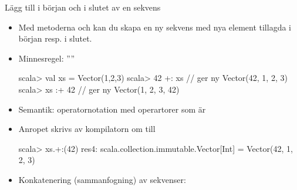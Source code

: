 \begin{Slide}{Lägg till i början och i slutet av en sekvens}
\begin{itemize}
\item Med metoderna \code{+:} och \code{:+} kan du skapa en ny sekvens med nya element tillagda i början resp. i slutet. 
\item Minnesregel: ''''
\begin{REPLnonum}
scala> val xs = Vector(1,2,3)
scala> 42 +: xs         // ger ny Vector(42, 1, 2, 3)
scala> xs :+ 42         // ger ny Vector(1, 2, 3, 42)
\end{REPLnonum}
\pause
\item Semantik: operatornotation med operartorer som  är 
\item Anropet  skrivs av kompilatorn om till    
\begin{REPL}
scala> xs.+:(42)
res4: scala.collection.immutable.Vector[Int] = Vector(42, 1, 2, 3)
\end{REPL}
\pause
\item Konkatenering (sammanfogning) av sekvenser: 

\end{itemize}
\end{Slide}

